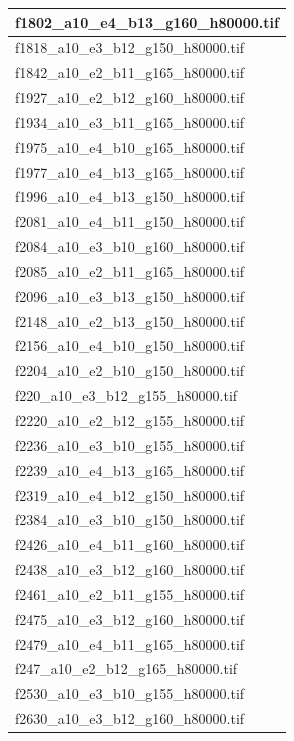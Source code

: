 \documentclass[12pt, twoside]{article}
\begin{document}
\begin{appendices}
\begin{longtable}{|l|}
		f1802\_a10\_e4\_b13\_g160\_h80000.tif \\ \hline 
		f1818\_a10\_e3\_b12\_g150\_h80000.tif \\ \hline 
		f1842\_a10\_e2\_b11\_g165\_h80000.tif \\ \hline 
		f1927\_a10\_e2\_b12\_g160\_h80000.tif \\ \hline 
		f1934\_a10\_e3\_b11\_g165\_h80000.tif \\ \hline 
		f1975\_a10\_e4\_b10\_g165\_h80000.tif \\ \hline 
		f1977\_a10\_e4\_b13\_g165\_h80000.tif \\ \hline 
		f1996\_a10\_e4\_b13\_g150\_h80000.tif \\ \hline 
		f2081\_a10\_e4\_b11\_g150\_h80000.tif \\ \hline 
		f2084\_a10\_e3\_b10\_g160\_h80000.tif \\ \hline 
		f2085\_a10\_e2\_b11\_g165\_h80000.tif \\ \hline 
		f2096\_a10\_e3\_b13\_g150\_h80000.tif \\ \hline 
		f2148\_a10\_e2\_b13\_g150\_h80000.tif \\ \hline 
		f2156\_a10\_e4\_b10\_g150\_h80000.tif \\ \hline 
		f2204\_a10\_e2\_b10\_g150\_h80000.tif \\ \hline 
		f220\_a10\_e3\_b12\_g155\_h80000.tif \\ \hline 
		f2220\_a10\_e2\_b12\_g155\_h80000.tif \\ \hline 
		f2236\_a10\_e3\_b10\_g155\_h80000.tif \\ \hline 
		f2239\_a10\_e4\_b13\_g165\_h80000.tif \\ \hline 
		f2319\_a10\_e4\_b12\_g150\_h80000.tif \\ \hline 
		f2384\_a10\_e3\_b10\_g150\_h80000.tif \\ \hline 
		f2426\_a10\_e4\_b11\_g160\_h80000.tif \\ \hline 
		f2438\_a10\_e3\_b12\_g160\_h80000.tif \\ \hline 
		f2461\_a10\_e2\_b11\_g155\_h80000.tif \\ \hline 
		f2475\_a10\_e3\_b12\_g160\_h80000.tif \\ \hline 
		f2479\_a10\_e4\_b11\_g165\_h80000.tif \\ \hline 
		f247\_a10\_e2\_b12\_g165\_h80000.tif \\ \hline 
		f2530\_a10\_e3\_b10\_g155\_h80000.tif \\ \hline 
		f2630\_a10\_e3\_b12\_g160\_h80000.tif \\ \hline 

\end{longtable}
\end{appendices}
\end{document}
